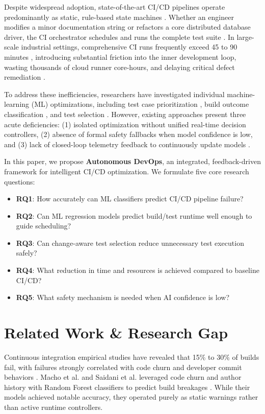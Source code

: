 \documentclass[conference]{IEEEtran}
\begin{document}
Despite widespread adoption, state-of-the-art CI/CD pipelines operate predominantly as static, rule-based state machines \cite{hilton2016usage}. Whether an engineer modifies a minor documentation string or refactors a core distributed database driver, the CI orchestrator schedules and runs the complete test suite \cite{chen2020practical}. In large-scale industrial settings, comprehensive CI runs frequently exceed 45 to 90 minutes \cite{memon2017taming}, introducing substantial friction into the inner development loop, wasting thousands of cloud runner core-hours, and delaying critical defect remediation \cite{vassallo2019continuous}.

To address these inefficiencies, researchers have investigated individual machine-learning (ML) optimizations, including test case prioritization \cite{elbaum2014techniques, marijan2013titan}, build outcome classification \cite{macho2018predicting, saidani2020predicting}, and test selection \cite{jin2022improving}. However, existing approaches present three acute deficiencies: (1) isolated optimization without unified real-time decision controllers, (2) absence of formal safety fallbacks when model confidence is low, and (3) lack of closed-loop telemetry feedback to continuously update models \cite{dang2019aiops, lou2017software}.

In this paper, we propose \textbf{Autonomous DevOps}, an integrated, feedback-driven framework for intelligent CI/CD optimization. We formulate five core research questions:
\begin{itemize}
    \item \textbf{RQ1}: How accurately can ML classifiers predict CI/CD pipeline failure?
    \item \textbf{RQ2}: Can ML regression models predict build/test runtime well enough to guide scheduling?
    \item \textbf{RQ3}: Can change-aware test selection reduce unnecessary test execution safely?
    \item \textbf{RQ4}: What reduction in time and resources is achieved compared to baseline CI/CD?
    \item \textbf{RQ5}: What safety mechanism is needed when AI confidence is low?
\end{itemize}

\section{Related Work \& Research Gap}
Continuous integration empirical studies have revealed that 15\% to 30\% of builds fail, with failures strongly correlated with code churn and developer commit behaviors \cite{beller2017travistorrent, debroy2014empirical}. Macho et al. and Saidani et al. leveraged code churn and author history with Random Forest classifiers to predict build breakages \cite{macho2018predicting, saidani2020predicting}. While their models achieved notable accuracy, they operated purely as static warnings rather than active runtime controllers.
\end{document}
